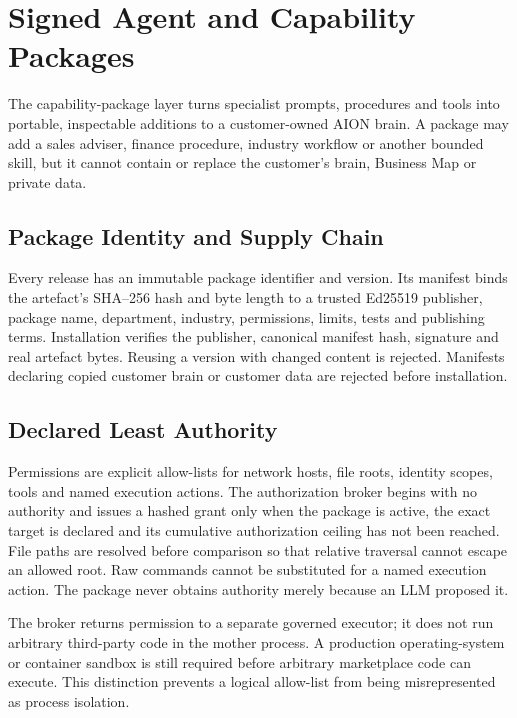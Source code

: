 \section{Signed Agent and Capability Packages}
\label{sec:capability-packages}

The capability-package layer turns specialist prompts, procedures and tools into portable,
inspectable additions to a customer-owned AION brain.  A package may add a sales adviser,
finance procedure, industry workflow or another bounded skill, but it cannot contain or
replace the customer's brain, Business Map or private data.

\subsection{Package Identity and Supply Chain}

Every release has an immutable package identifier and version.  Its manifest binds the
artefact's SHA--256 hash and byte length to a trusted Ed25519 publisher, package name,
department, industry, permissions, limits, tests and publishing terms.  Installation verifies
the publisher, canonical manifest hash, signature and real artefact bytes.  Reusing a version
with changed content is rejected.  Manifests declaring copied customer brain or customer data
are rejected before installation.

\subsection{Declared Least Authority}

Permissions are explicit allow-lists for network hosts, file roots, identity scopes, tools
and named execution actions.  The authorization broker begins with no authority and issues a
hashed grant only when the package is active, the exact target is declared and its cumulative
authorization ceiling has not been reached.  File paths are resolved before comparison so that
relative traversal cannot escape an allowed root.  Raw commands cannot be substituted for a
named execution action.  The package never obtains authority merely because an LLM proposed it.

The broker returns permission to a separate governed executor; it does not run arbitrary
third-party code in the mother process.  A production operating-system or container sandbox is
still required before arbitrary marketplace code can execute.  This distinction prevents a
logical allow-list from being misrepresented as process isolation.

